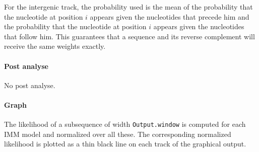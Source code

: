 For the intergenic track, the probability used is the mean of the
probability that the nucleotide at position $i$ appears given the
nucleotides that precede him and the probability that the nucleotide
at position $i$ appears given the nucleotides that follow him.  This
guarantees that a sequence and its reverse complement will receive the
same weights exactly.

\paragraph{Post analyse}

No post analyse.

\paragraph{Graph}

The likelihood of a subsequence of width \texttt{Output.window} is
computed for each IMM model and normalized over all these. The
corresponding normalized likelihood is plotted as a thin black line on
each track of the graphical output.


